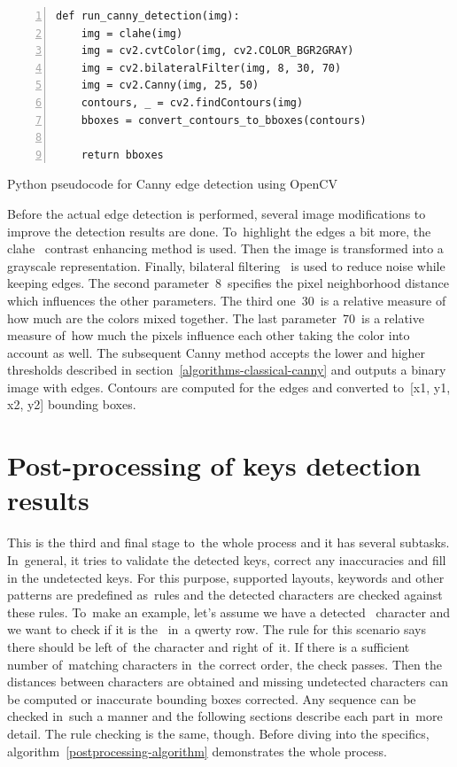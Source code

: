 \begin{algorithm}[!hbt]
    \begin{lstlisting}[keywords={def, return}, xleftmargin=20pt, numbers=left]
def run_canny_detection(img):
    img = clahe(img)
    img = cv2.cvtColor(img, cv2.COLOR_BGR2GRAY)
    img = cv2.bilateralFilter(img, 8, 30, 70)
    img = cv2.Canny(img, 25, 50)
    contours, _ = cv2.findContours(img)
    bboxes = convert_contours_to_bboxes(contours)

    return bboxes
    \end{lstlisting}
    \caption{Python pseudocode for Canny edge detection using OpenCV}
    \label{canny-pseudocode}
\end{algorithm}

Before the actual edge detection is performed, several image modifications to improve the detection results are done. To~highlight the edges a bit more, the clahe~\cite{clahe} contrast enhancing method is used. Then the image is transformed into a grayscale representation. Finally, bilateral filtering~\cite{opencv-library} is used to reduce noise while keeping edges. The second parameter~8~specifies the pixel neighborhood distance which influences the other parameters. The third one~30~is a relative measure of how much are the colors mixed together. The last parameter~70~is a relative measure of~how much the pixels influence each other taking the color into account as well. The subsequent Canny method accepts the lower and higher thresholds described in section~\ref{algorithms-classical-canny} and outputs a binary image with edges. Contours are computed for the edges and converted to~[x1, y1, x2, y2] bounding boxes.

\section{Post-processing of keys detection results}
\label{design-keys-postprocessing}
This is the third and final stage to~the whole process and it has several subtasks. In~general, it tries to validate the detected keys, correct any inaccuracies and fill in the undetected keys. For this purpose, supported layouts, keywords and other patterns are predefined as~rules and the detected characters are checked against these rules. To~make an example, let's assume we have a detected~ character and we want to check if it is the~ in~a qwerty row. The rule for this scenario says there should be  left of~the character and  right of~it. If there is a sufficient number of~matching characters in~the correct order, the check passes. Then the distances between characters are obtained and missing undetected characters can be computed or inaccurate bounding boxes corrected. Any sequence can be checked in~such a manner and the following sections describe each part in~more detail. The rule checking is the same, though. Before diving into the specifics, algorithm~\ref{postprocessing-algorithm} demonstrates the whole process.

